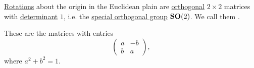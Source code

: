 \begin{proposition}\label{thm:plane_rotation_matrix}
  \hyperref[def:rigid_motion/rotation]{Rotations} about the origin in the Euclidean plain are \hyperref[def:unitary_matrix]{orthogonal} \( 2 \times 2 \) matrices with \hyperref[def:matrix_determinant]{determinant} \( 1 \), i.e. the \hyperref[def:unitary_group]{special orthogonal group} \( \operatorname{\mathbf{SO}}(2) \). We call them .

  These are the matrices with entries
  \begin{equation}\label{eq:thm:plane_rotation_matrix}
    \begin{pmatrix}
      a & -b \\
      b & a
    \end{pmatrix},
  \end{equation}
  where \( a^2 + b^2 = 1 \).
\end{proposition}
